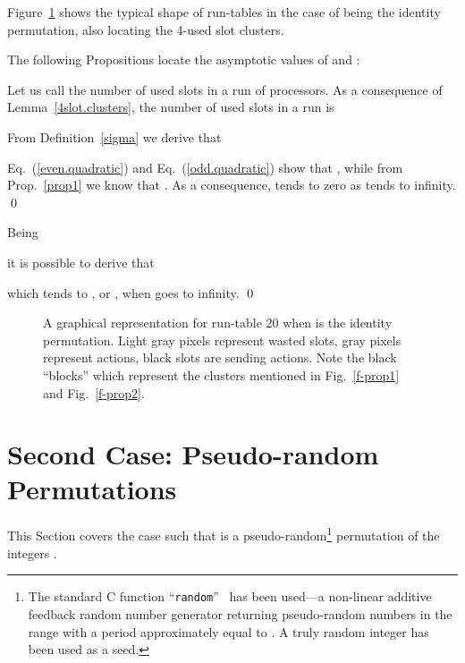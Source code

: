 \documentclass{elsart}
\begin{document}
Figure~\ref{z20} shows the typical shape of run-tables 
in the case of  being the identity permutation, also
locating the 4-used slot clusters. 



The following Propositions locate the asymptotic values of  and :
\begin{prop}\label{id-eps}

\end{prop}
\begin{pf}
Let us call  the number of used slots in a run of  processors.
As a consequence of Lemma~\ref{4slot.clusters}, the number of used slots in a run is

From Definition~\ref{sigma} we derive that

Eq.~(\ref{even.quadratic}) and Eq.~(\ref{odd.quadratic}) show that 
,
while from Prop.~\ref{prop1} we know that .
As a consequence,  tends to zero as  tends to infinity.
\qed
\end{pf}

\begin{prop}\label{id-mu}

\end{prop}
\begin{pf}
Being 

it is possible to derive that

which tends to , or , when  goes to infinity.
\qed
\end{pf}

\begin{figure}
\centerline{}
\caption{A graphical representation for run-table 20 when  is
the identity permutation. Light gray pixels represent wasted slots, 
gray pixels represent  actions, black slots are sending actions.
Note the black ``blocks'' which represent the clusters mentioned 
in Fig.~\ref{f-prop1} and Fig.~\ref{f-prop2}.}
\label{z20}
\end{figure}

\section{Second Case: Pseudo-random Permutations}\label{randcase}
This Section covers the case such that
 is a pseudo-random\footnote{The standard C function ``{\tt random}''~\cite{Rand} has been 
	used---a non-linear additive feedback random number
	generator returning pseudo-random numbers in the range 
	with a period approximately equal to . A truly
	random integer has been used as a seed.}
permutation of the integers .
\end{document}

